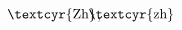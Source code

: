 \documentclass[12pt]{amsart}
\newcommand{\Zh}{\hbox{\hspace{-5.8mm} \textcyr{Zh}}}
\newcommand{\zh}{\hbox{\hspace{-5.8mm} \textcyr{zh}}}
\begin{document}
$\Zh$, $\zh$
\end{document}
